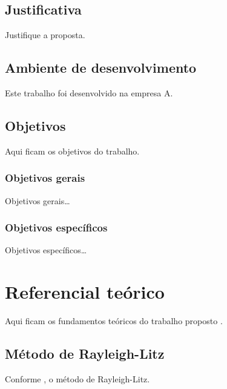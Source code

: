 \documentclass[12pt,oneside,english,brazil,lmodern]{ucsmonograph}
\begin{document}
	\section{Justificativa}
	Justifique a proposta.
	
	\section{Ambiente de desenvolvimento}
	Este trabalho foi desenvolvido na empresa A.
	
	\section{Objetivos}
	Aqui ficam os objetivos do trabalho.
	
	\subsection{Objetivos gerais}
	Objetivos gerais\dots
	
	\subsection{Objetivos específicos}
	Objetivos específicos\dots
	
	\chapter{Referencial teórico}
	Aqui ficam os fundamentos teóricos do trabalho proposto \cite{rao:2008}.
	
	\section{Método de Rayleigh-Litz}
	Conforme , o método de Rayleigh-Litz.
	
	\postextual
	
	
	
\end{document}
